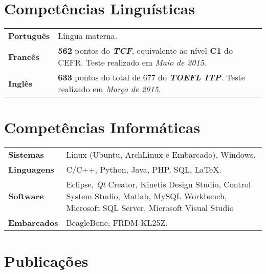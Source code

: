 \documentclass[10pt, a4paper]{article}
\begin{document}



\section{Competências Linguísticas}

\begin{tabular}{p{} p{}}

\textbf{Português} & Língua materna.  \\

\textbf{Francês} & \textbf{562} pontos do \textbf{\textit{TCF}},
equivalente ao nível \textbf{C1} do CEFR. Teste realizado em \textit{Maio
de 2015}.\\

\textbf{Inglês} & \textbf{633} pontos do total de 677 do \textbf{\textit{TOEFL
ITP}}. Teste realizado em \textit{Março de 2015}. \\

\end{tabular}


\section{Competências Informáticas}

\begin{tabular}{p{} p{}}

\textbf{Sistemas} & Linux (Ubuntu, ArchLinux e Embarcado), Windows.  \\

\textbf{Linguagens} & C/C++, Python, Java, PHP,  SQL, \LaTeX.  \\

\textbf{Software} & Eclipse, \textit{Qt} Creator, Kinetis Design Studio,
Control System Studio, Matlab, MySQL Workbench, Microsoft SQL Server, Microsoft
Visual Studio\\

\textbf{Embarcados} & BeagleBone, FRDM-KL25Z. \\

\end{tabular}


\section{Publicações}
\end{document}
